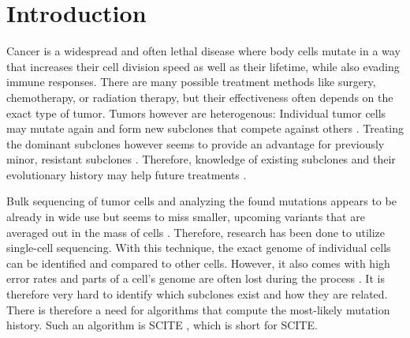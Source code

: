\chapter{Introduction}
\label{ch:introduction}


Cancer is a widespread and often lethal disease \cite{10.1001/jamaoncol.2021.6987} where body cells mutate in a way that increases their cell division speed as well as their lifetime, while also evading immune responses. There are many possible treatment methods like surgery, chemotherapy, or radiation therapy, but their effectiveness often depends on the exact type of tumor. Tumors however are heterogenous: Individual tumor cells may mutate again and form new subclones that compete against others \cite{nik2012life}. Treating the dominant subclones however seems to provide an advantage for previously minor, resistant subclones \cite{gillies2012evolutionary}. Therefore, knowledge of existing subclones and their evolutionary history may help future treatments \cite{greaves2012clonal, stratton2009cancer, swanton2012intratumor}.

Bulk sequencing of tumor cells and analyzing the found mutations appears to be already in wide use but seems to miss smaller, upcoming variants that are averaged out in the mass of cells \cite{navin2014cancer}. Therefore, research has been done to utilize single-cell sequencing. With this technique, the exact genome of individual cells can be identified and compared to other cells. However, it also comes with high error rates and parts of a cell's genome are often lost during the process \cite{tree2016}. It is therefore very hard to identify which subclones exist and how they are related. There is therefore a need for algorithms that compute the most-likely mutation history. Such an algorithm is \acs{SCITE} \cite{tree2016}, which is short for \acl{SCITE}.


